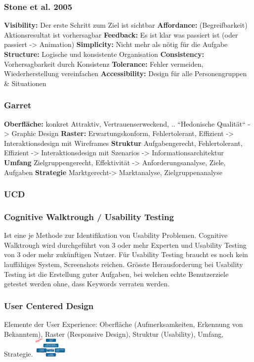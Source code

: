 \begin{multicols*}{4}
\subsubsection{Stone et al. 2005}
\textbf{Visibility:} Der erste Schritt zum Ziel ist sichtbar
\textbf{Affordance:} (Begreifbarkeit) Aktionsresultat ist vorhersagbar
\textbf{Feedback:} Es ist klar was passiert ist (oder passiert -> Animation)
\textbf{Simplicity:} Nicht mehr als nötig für die Aufgabe
\textbf{Structure:} Logische und konsistente Organisation
\textbf{Consistency:} Vorhersagbarkeit durch Konsistenz
\textbf{Tolerance:} Fehler vermeiden, Wiederherstellung vereinfachen
\textbf{Accessibility:} Design für alle Personengruppen \& Situationen
\subsubsection{Garret}
\textbf{Oberfläche:} konkret Attraktiv, Vertrauenserweckend, .. “Hedonische Qualität“
-> Graphic Design
\textbf{Raster:} Erwartungskonform, Fehlertolerant, Effizient -> Interaktionsdesign mit Wireframes
\textbf{Struktur} Aufgabengerecht, Fehlertolerant, Effizient
-> Interaktionsdesign mit Szenarios -> Informationsarchitektur
\textbf{Umfang} Zielgruppengerecht, Effektivität -> Anforderungsanalyse, Ziele, Aufgaben
\textbf{Strategie}  Marktgerecht-> Marktanalyse, Zielgruppenanalyse
\subsubsection{UCD}
\begin{multicols}{2}
\subsubsection{Cognitive Walktrough / Usability Testing}
\tiny Ist eine je Methode zur Identifikation von Usability Problemen. Cognitive 
Walktrough wird durchgeführt von 3 oder mehr Experten und Usability Testing 
von 3 oder mehr zukünftigen Nutzer. Für Usability Testing braucht es noch kein 
lauffähiges System, Screenshots reichen. Grösste Herausforderung bei Usability 
Testing ist die Erstellung guter Aufgaben, bei welchen echte Benutzerziele getestet 
werden ohne, dass Keywords verraten werden.
\subsubsection{User Centered Design}
Elemente der User Experience: Oberfläche (Aufmerksamkeiten, 
Erkennung von Bekanntem), Raster (Responsive Design), Struktur (Usability), 
Umfang, Strategie.
\includegraphics[width=0.12\textwidth]{images/ucd}
\end{multicols}

\end{multicols*}
